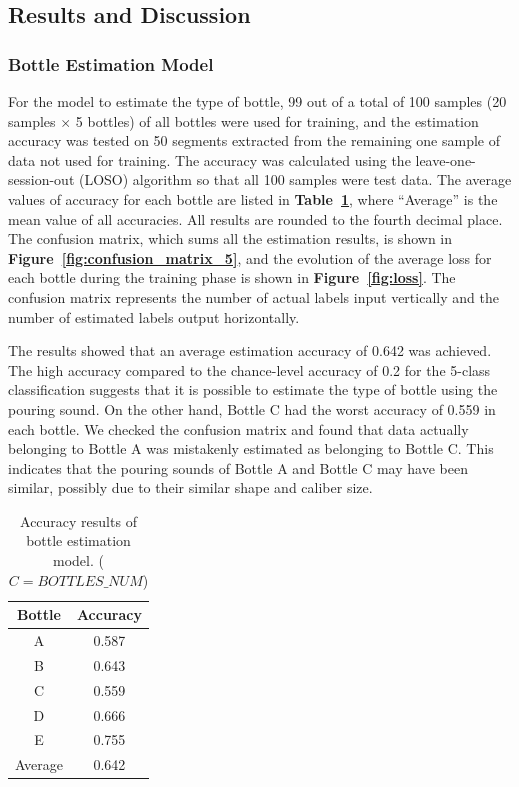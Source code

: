 \documentclass[sigconf]{acmart}
\newcommand\figref[1]{\textbf{Figure~\ref{fig:#1}}}
\newcommand\tabref[1]{\textbf{Table~\ref{tab:#1}}}
\begin{document}
\subsection{Results and Discussion}

\subsubsection{Bottle Estimation Model}
For the model to estimate the type of bottle, 99 out of a total of 100 samples (20 samples $\times$ 5 bottles) of all bottles were used for training, and the estimation accuracy was tested on 50 segments extracted from the remaining one sample of data not used for training. The accuracy was calculated using the leave-one-session-out (LOSO) algorithm so that all 100 samples were test data. The average values of accuracy for each bottle are listed in \tabref{result_5}, where ``Average'' is the mean value of all accuracies. All results are rounded to the fourth decimal place. The confusion matrix, which sums all the estimation results, is shown in \figref{confusion_matrix_5}, and the evolution of the average loss for each bottle during the training phase is shown in \figref{loss}. The confusion matrix represents the number of actual labels input vertically and the number of estimated labels output horizontally.\par

The results showed that an average estimation accuracy of 0.642 was achieved. The high accuracy compared to the chance-level accuracy of 0.2 for the 5-class classification suggests that it is possible to estimate the type of bottle using the pouring sound. On the other hand, Bottle C had the worst accuracy of 0.559 in each bottle. We checked the confusion matrix and found that data actually belonging to Bottle A was mistakenly estimated as belonging to Bottle C. This indicates that the pouring sounds of Bottle A and Bottle C may have been similar, possibly due to their similar shape and caliber size.

\begin{table}[!t]
  \small
  \centering
  \caption{Accuracy results of bottle estimation model. ($C=BOTTLES\_NUM$)}
  \begin{tabular}{c|c} \hline\hline
    Bottle & Accuracy \\ \hline
    A & 0.587 \\
    B & 0.643 \\
    C & 0.559 \\
    D & 0.666 \\
    E & 0.755 \\ \hline
    Average & 0.642 \\ \hline
  \end{tabular}
  \label{tab:result_5}
\end{table}
\end{document}
